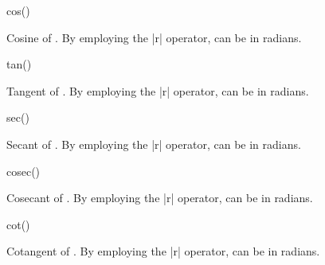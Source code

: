 \begin{math-function}{cos()}

	Cosine of . By employing the |r| operator,  can be in 
	radians.

\begin{codeexample}[]
 \pgfmathresult
\end{codeexample}

\begin{codeexample}[]
 \pgfmathresult
\end{codeexample}

\end{math-function}

\begin{math-function}{tan()}

	Tangent of . By employing the |r| operator,  can be in 
	radians.
	
\begin{codeexample}[]
 \pgfmathresult
\end{codeexample}

\begin{codeexample}[]
 \pgfmathresult
\end{codeexample}

\end{math-function}


\begin{math-function}{sec()}

	Secant of . By employing the |r| operator,  can be in 
	radians.

\begin{codeexample}[]
 \pgfmathresult
\end{codeexample}

\end{math-function}

\begin{math-function}{cosec()}

	Cosecant of . By employing the |r| operator,  can be in 
	radians.
	
\begin{codeexample}[]
 \pgfmathresult
\end{codeexample}

\end{math-function}

\begin{math-function}{cot()}

	Cotangent of . By employing the |r| operator,  can be in 
	radians.
	
\begin{codeexample}[]
 \pgfmathresult
\end{codeexample}

\end{math-function}

